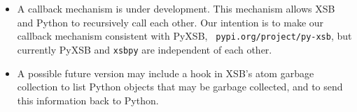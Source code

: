\begin{itemize}
\item A callback mechanism is under development.  This mechanism
  allows XSB and Python to recursively call each other.  Our intention
  is to make our callback mechanism consistent with PyXSB, {\tt
    pypi.org/project/py-xsb}, but currently PyXSB and {\tt xsbpy} are
  independent of each other.

\item A possible future version may include a hook in XSB's atom
  garbage collection to list Python objects that may be garbage
  collected, and to send this information back to Python.  
\end{itemize}  


